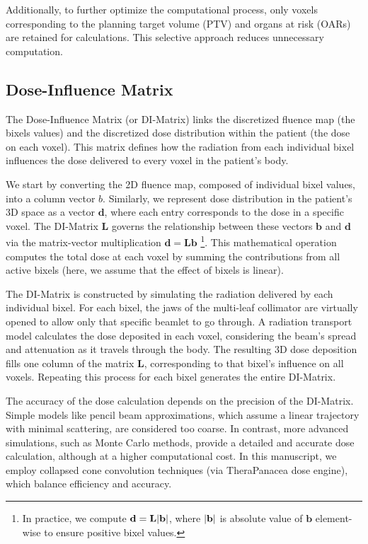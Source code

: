 Additionally, to further optimize the computational process, only voxels corresponding to the planning target volume (PTV) and organs at risk (OARs) are retained for calculations.
This selective approach reduces unnecessary computation.

\subsection[DI-Matrix]{Dose-Influence Matrix}
The Dose-Influence Matrix (or DI-Matrix) links the discretized fluence map (the bixels values) and the discretized dose distribution within the patient (the dose on each voxel).
This matrix defines how the radiation from each individual bixel influences the dose delivered to every voxel in the patient's body.

We start by converting the 2D fluence map, composed of individual bixel values, into a column vector $b$.
Similarly, we represent dose distribution in the patient's 3D space as a vector $\mathbf{d}$, where each entry corresponds to the dose in a specific voxel.
The DI-Matrix $\textbf{L}$ governs the relationship between these vectors $\mathbf{b}$ and $\mathbf{d}$ via the matrix-vector multiplication $\mathbf{d} = \textbf{L}\mathbf{b}$ \footnote{In practice, we compute $\textbf{d} = \textbf{L}|{\textbf{b}}|$, where $|{\textbf{b}}|$ is absolute value of $\textbf{b}$ element-wise to ensure positive bixel values.}.
This mathematical operation computes the total dose at each voxel by summing the contributions from all active bixels (here, we assume that the effect of bixels is linear).

The DI-Matrix is constructed by simulating the radiation delivered by each individual bixel.
For each bixel, the jaws of the multi-leaf collimator are virtually opened to allow only that specific beamlet to go through.
A radiation transport model calculates the dose deposited in each voxel, considering the beam's spread and attenuation as it travels through the body.
The resulting 3D dose deposition fills one column of the matrix $\textbf{L}$, corresponding to that bixel's influence on all voxels.
Repeating this process for each bixel generates the entire DI-Matrix.

The accuracy of the dose calculation depends on the precision of the DI-Matrix.
Simple models like pencil beam approximations, which assume a linear trajectory with minimal scattering, are considered too coarse.
In contrast, more advanced simulations, such as Monte Carlo methods, provide a detailed and accurate dose calculation, although at a higher computational cost.
In this manuscript, we employ collapsed cone convolution techniques (via TheraPanacea dose engine), which balance efficiency and accuracy.

